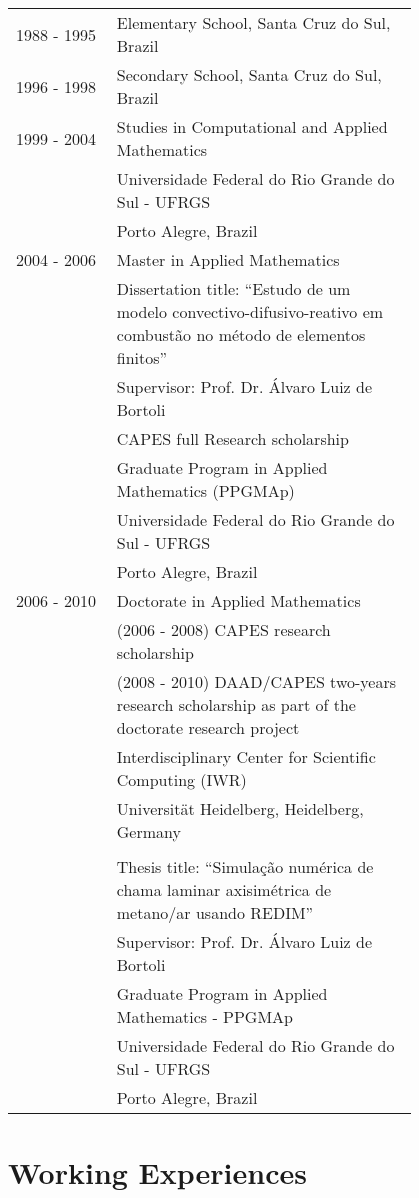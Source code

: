 \documentclass[a4paper,12pt]{article}
\begin{document}
\begin{longtable}[H]{p{0.2\linewidth}p{0.6\linewidth}}
  1988 - 1995 & Elementary School, Santa Cruz do Sul, Brazil\\
  1996 - 1998 & Secondary School, Santa Cruz do Sul, Brazil\\
  1999 - 2004 & Studies in Computational and Applied Mathematics\\
  & Universidade Federal do Rio Grande do Sul - UFRGS\\
  & Porto Alegre, Brazil\\
  2004 - 2006 & Master in Applied Mathematics\\
  & Dissertation title: ``Estudo de um modelo convectivo-difusivo-reativo em combustão no método de elementos finitos''\\
  & Supervisor: Prof. Dr. Álvaro Luiz de Bortoli\\
  & CAPES full Research scholarship \\
  & Graduate Program in Applied Mathematics (PPGMAp)\\
  & Universidade Federal do Rio Grande do Sul - UFRGS\\
  & Porto Alegre, Brazil\\
  2006 - 2010 & Doctorate in Applied Mathematics\\
  & (2006 - 2008) CAPES research scholarship\\
  & (2008 - 2010) DAAD/CAPES two-years research scholarship as part of the doctorate research project \\
  & Interdisciplinary Center for Scientific Computing (IWR)\\
  & Universität Heidelberg, Heidelberg, Germany\\
  & \\
  & Thesis title: ``Simulação numérica de chama laminar axisimétrica de metano/ar usando REDIM''\\
  & Supervisor: Prof. Dr. Álvaro Luiz de Bortoli\\
  & Graduate Program in Applied Mathematics - PPGMAp\\
  & Universidade Federal do Rio Grande do Sul - UFRGS\\
  & Porto Alegre, Brazil  
\end{longtable}

\section{Working Experiences}
\end{document}
